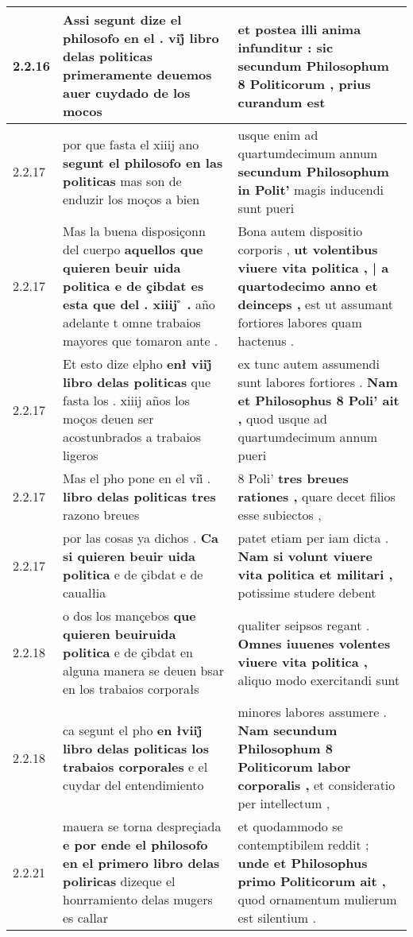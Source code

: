\begin{tabular}{|p{1cm}|p{6.5cm}|p{6.5cm}|}
2.2.16 & Assi segunt dize el philosofo en el . \textbf{ vij̊ libro delas politicas } primeramente deuemos auer cuydado de los mocos & et postea illi anima infunditur : \textbf{ sic secundum Philosophum 8 Politicorum , } prius curandum est \\\hline
2.2.17 & por que fasta el xiiij ano \textbf{ segunt el philosofo en las politicas } mas son de enduzir los moços a bien & usque enim ad quartumdecimum annum \textbf{ secundum Philosophum in Polit’ } magis inducendi sunt pueri \\\hline
2.2.17 & Mas la buena disposiçonn del cuerpo \textbf{ aquellos que quieren beuir uida politica e de çibdat es esta que del . xiiij ̊ . } año adelante t omne trabaios mayores que tomaron ante . & Bona autem dispositio corporis , \textbf{ ut volentibus viuere vita politica , | a quartodecimo anno et deinceps , } est ut assumant fortiores labores quam hactenus . \\\hline
2.2.17 & Et esto dize elpho \textbf{ enł viij̊ libro delas politicas } que fasta los . xiiij años los moços deuen ser acostunbrados a trabaios ligeros & ex tunc autem assumendi sunt labores fortiores . \textbf{ Nam et Philosophus 8 Poli’ ait , } quod usque ad quartumdecimum annum pueri \\\hline
2.2.17 & Mas el pho pone en el vii̊ . \textbf{ libro delas politicas tres } razono breues & 8 Poli’ \textbf{ tres breues rationes , } quare decet filios esse subiectos , \\\hline
2.2.17 & por las cosas ya dichos . \textbf{ Ca si quieren beuir uida politica } e de çibdat e de caualłia & patet etiam per iam dicta . \textbf{ Nam si volunt viuere vita politica et militari , } potissime studere debent \\\hline
2.2.18 & o dos los mançebos \textbf{ que quieren beuiruida politica } e de çibdat en alguna manera se deuen bsar en los trabaios corporałs & qualiter seipsos regant . \textbf{ Omnes iuuenes volentes viuere vita politica , } aliquo modo exercitandi sunt \\\hline
2.2.18 & ca segunt el pho \textbf{ en łviij̊ libro delas politicas los trabaios corporales } e el cuydar del entendimiento & minores labores assumere . \textbf{ Nam secundum Philosophum 8 Politicorum labor corporalis , } et consideratio per intellectum , \\\hline
2.2.21 & mauera se torna despreçiada \textbf{ e por ende el philosofo en el primero libro delas poliricas } dizeque el honrramiento delas mugers es callar & et quodammodo se contemptibilem reddit ; \textbf{ unde et Philosophus primo Politicorum ait , } quod ornamentum mulierum est silentium . \\\hline

\end{tabular}
